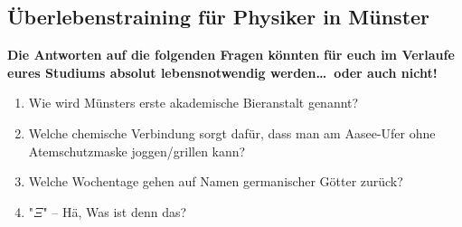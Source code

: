 \vspace{-3ex}

\clearpage

\subsection{Überlebenstraining für Physiker in Münster}
\begin{multicols}{2}
\textbf{Die Antworten auf die folgenden Fragen könnten für euch im Verlaufe eures Studiums absolut lebensnotwendig werden\dots\ oder auch nicht!}

\begin{enumerate}[before=\itshape\RaggedRight]
	\item Wie wird Münsters erste akademische Bieranstalt genannt?
	\label{itm:rätsel_bieranstalt}
	\item Welche chemische Verbindung sorgt dafür, dass man am Aasee-Ufer ohne Atemschutzmaske joggen/grillen kann?
	\label{itm:rätsel_ethanol}
	\item Welche Wochentage gehen auf Namen germanischer Götter zurück?
	\label{itm:rätsel_götter}
	\item "$\Xi$" -- Hä, Was ist denn das?
	\begin{fibelanswer}

\end{fibelanswer}
\end{enumerate}
\end{multicols}
